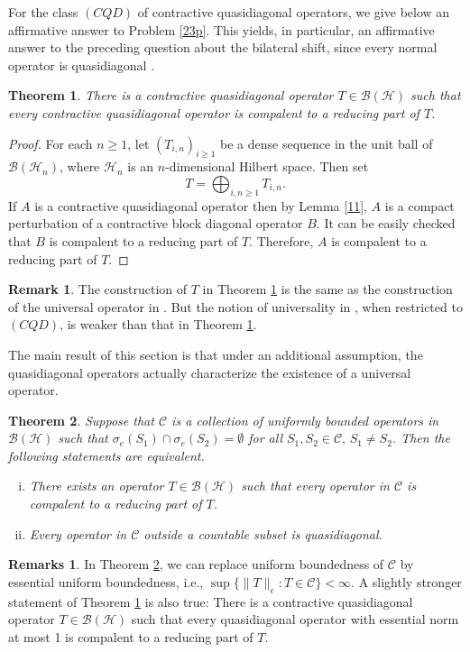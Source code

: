 \documentclass[11pt]{amsart}
\newtheorem{theorem}{Theorem}[section]
\theoremstyle{definition}
\newtheorem*{remark}{Remark}
\newtheorem*{remarks}{Remarks}
\numberwithin{equation}{section}
\begin{document}
For the class $(CQD)$ of contractive quasidiagonal operators, we give below an affirmative answer to Problem \ref{23p}. This yields, in particular, an affirmative answer
to the preceding question about the bilateral shift, since every normal operator is quasidiagonal \cite[page 903]{Halmos}.
\begin{theorem}\label{21}
There is a contractive quasidiagonal operator $T\in \mathcal{B(H)}$ such that every contractive quasidiagonal operator is compalent to a reducing part of $T$.
\end{theorem}
\begin{proof}
For each $n\geq 1$, let $(T_{i,n})_{i\geq 1}$ be a dense sequence in the unit ball of $\mathcal{B}(\mathcal{H}_{n})$, where $\mathcal{H}_{n}$ is an $n$-dimensional Hilbert
space. Then set
\[T=\bigoplus_{i,n\geq 1}T_{i,n}.\]
If $A$ is a contractive quasidiagonal operator then by Lemma \ref{11}, $A$ is a compact perturbation of a contractive block diagonal operator $B$. It can be easily
checked that $B$ is compalent to a reducing part of $T$. Therefore, $A$ is compalent to a reducing part of $T$.
\end{proof}
\begin{remark}
The construction of $T$ in Theorem \ref{21} is the same as the construction of the universal operator in \cite[Corollary 4.2]{Herrero}. But the notion
of universality in \cite[Corollary 4.2]{Herrero}, when restricted to $(CQD)$, is weaker than that in Theorem \ref{21}.
\end{remark}
The main result of this section is that under an additional assumption, the quasidiagonal operators actually characterize the existence of a universal operator.
\begin{theorem}\label{22}
Suppose that $\mathcal{C}$ is a collection of uniformly bounded operators in $\mathcal{B(H)}$ such that $\sigma_{e}(S_{1})\cap\sigma_{e}(S_{2})=\emptyset$ for all $S_{1},
S_{2}\in\mathcal{C},\,S_{1}\neq S_{2}$. Then the following statements are equivalent.
\begin{enumerate}[(i)]
\item There exists an operator $T\in\mathcal{B(H)}$ such that every operator in $\mathcal{C}$ is compalent to a reducing part of $T$.
\item Every operator in $\mathcal{C}$ outside a countable subset is quasidiagonal.
\end{enumerate}
\end{theorem}
\begin{remarks}
In Theorem \ref{22}, we can replace uniform boundedness of $\mathcal{C}$ by essential uniform boundedness, i.e., $\sup\{\|T\|_{e}:T\in\mathcal{C}\}<\infty$. A slightly
stronger statement of Theorem \ref{21} is also true: There is a contractive quasidiagonal operator $T\in \mathcal{B(H)}$ such that every quasidiagonal operator with
essential norm at most 1 is compalent to a reducing part of $T$.
\end{remarks}
\end{document}
